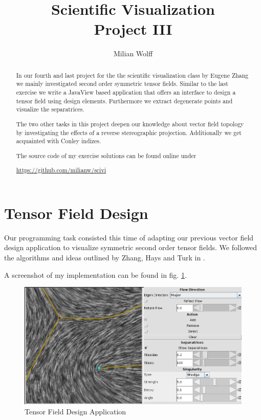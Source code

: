 \documentclass[a4paper,10pt,notitlepage]{scrartcl}
\title{Scientific Visualization\\Project III}
\author{Milian Wolff}
\begin{document}
\maketitle

\begin{abstract}
In our fourth and last project for the the scientific visualization class
by Eugene Zhang we mainly investigated second order symmetric tensor fields.
Similar to the last exercise we write a JavaView based application that offers
an interface to design a tensor field using design elements. Furthermore we
extract degenerate points and visualize the separatrices.

The two other tasks in this project deepen our knowledge about vector field
topology by investigating the effects of a reverse stereographic projection.
Additionally we get acquainted with Conley indizes.

The source code of my exercise solutions can be found online under

\begin{center}\url{https://github.com/milianw/scivi}\end{center}
\end{abstract}

\begingroup
\let\clearpage\relax

\tableofcontents
\endgroup

\newpage

\section{Tensor Field Design}

Our programming task consisted this time of adapting our previous vector field
design application to visualize symmetric second order tensor fields. We
followed the algorithms and ideas outlined by Zhang, Hays and Turk in
\cite{tfd}.

A screenshot of my implementation can be found in fig. \ref{fig:tfd-app}.

\begin{figure}
 \centering
 \includegraphics[scale=0.5]{img-4-2/app.png}
 \caption{Tensor Field Design Application}
 \label{fig:tfd-app}
\end{figure}
\end{document}
